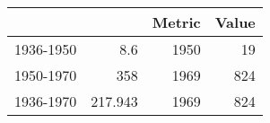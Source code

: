 \begin{tabular}{lrrr}
\hline
           &         &   Metric &   Value \\
\hline
 1936-1950 &   8.6   &     1950 &      19 \\
 1950-1970 & 358     &     1969 &     824 \\
 1936-1970 & 217.943 &     1969 &     824 \\
\hline
\end{tabular}